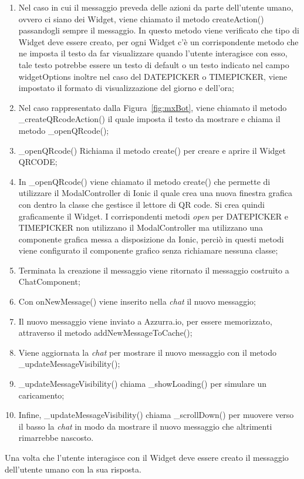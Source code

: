 \begin{enumerate}
	\item Nel caso in cui il messaggio preveda delle azioni da parte dell'utente umano, ovvero ci siano dei Widget, viene chiamato il metodo createAction() passandogli sempre il messaggio. In questo metodo viene verificato che tipo di Widget deve essere creato, per ogni Widget c'è un corrispondente metodo che ne imposta il testo da far visualizzare quando l'utente interagisce con esso, tale testo potrebbe essere un testo di default o un testo indicato nel campo widgetOptions inoltre nel caso del DATEPICKER o TIMEPICKER, viene impostato il formato di visualizzazione del giorno e dell'ora;
	\item Nel caso rappresentato dalla Figura~\ref{fig:mxBot}, viene chiamato il metodo \_createQRcodeAction()
	 il quale imposta il testo da mostrare e chiama il metodo \_openQRcode();
	\item \_openQRcode() Richiama il metodo create() per creare e aprire il Widget QRCODE;
	\item In \_openQRcode() viene chiamato il metodo create() che permette di utilizzare il ModalController di Ionic il quale crea una nuova finestra grafica con dentro la classe che gestisce il lettore di QR code. Si crea quindi graficamente il Widget. I corrispondenti metodi \emph{open} per DATEPICKER e TIMEPICKER non utilizzano il ModalController ma utilizzano una componente grafica messa a disposizione da Ionic, perciò in questi metodi viene configurato il componente grafico senza richiamare nessuna classe;
	\item Terminata la creazione il messaggio viene ritornato il messaggio costruito a ChatComponent;
	\item Con onNewMessage() viene inserito nella \emph{chat} il nuovo messaggio;
	\item Il nuovo messaggio viene inviato a Azzurra.io, per essere memorizzato, attraverso il metodo addNewMessageToCache();
	\item Viene aggiornata la \emph{chat} per mostrare il nuovo messaggio con il metodo \_updateMessageVisibility();
	\item \_updateMessageVisibility() chiama \_showLoading() per simulare un caricamento;
	\item Infine, \_updateMessageVisibility() chiama \_scrollDown() per muovere verso il basso la \emph{chat} in modo da mostrare il nuovo messaggio che altrimenti rimarrebbe nascosto.
\end{enumerate}

Una volta che l'utente interagisce con il Widget deve essere creato il messaggio dell'utente umano con la sua risposta. 
\clearpage
